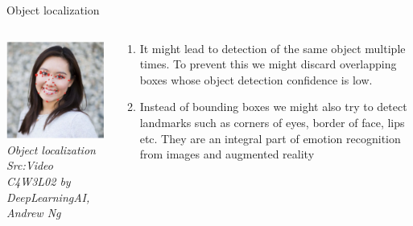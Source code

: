 \begin{frame}{Object localization}
	\begin{columns}[T]
        \begin{column}{0.4\textwidth}
        	\includegraphics[width=\textwidth]{images/landmark detection.png}
			\tiny{\textit{Object localization\\ Src:Video C4W3L02 by DeepLearningAI, Andrew Ng}}
        \end{column}
		\begin{column}{0.6\textwidth}
			\begin{enumerate}[$\bullet$]
				\item It might lead to detection of the same object multiple times. To prevent this we might discard overlapping boxes whose object detection confidence is low.\pause
				\item Instead of bounding boxes we might also try to detect landmarks such as corners of eyes, border of face, lips etc. They are an integral part of emotion recognition from images and augmented reality
			\end{enumerate}
		\end{column} 
    \end{columns}
\end{frame}

